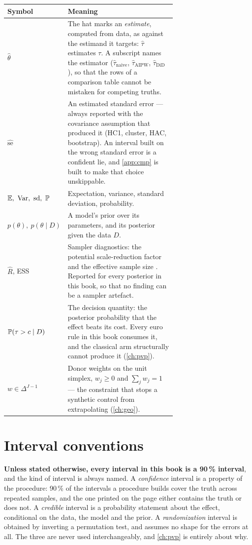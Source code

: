 \begin{center}
\small
\begin{longtable}{@{}l@{\hspace{1.5em}}p{0.68\linewidth}@{}}
\toprule
\textbf{Symbol} & \textbf{Meaning} \\
\midrule
\endhead
$\hat\theta$ & The hat marks an \emph{estimate}, computed from data, as against the estimand it
  targets: $\hat\tau$ estimates $\tau$. A subscript names the estimator
  ($\hat\tau_{\text{naive}}$, $\hat\tau_{\text{AIPW}}$, $\hat\tau_{\text{DiD}}$), so that the rows
  of a comparison table cannot be mistaken for competing truths. \\[2pt]
$\hat{\mathrm{se}}$ & An estimated standard error --- always reported with the covariance
  assumption that produced it (HC1, cluster, HAC, bootstrap). An interval built on the wrong
  standard error is a confident lie, and \cref{app:cmp} is built to make that choice
  unskippable. \\[2pt]
$\E,\ \Var,\ \sd,\ \Prob$ & Expectation, variance, standard deviation, probability. \\[2pt]
$p(\theta),\ p(\theta \mid D)$ & A model's prior over its parameters, and its posterior given the
  data $D$. \\[2pt]
$\hat R$, ESS & Sampler diagnostics: the potential scale-reduction factor and the effective sample
  size \citep{vehtari2021}. Reported for every posterior in this book, so that no finding can be a
  sampler artefact. \\[2pt]
$\operatorname{\mathbb{P}}(\tau > c \mid D)$ & The decision quantity: the posterior probability that the effect beats
  its cost. Every euro rule in this book consumes it, and the classical arm structurally cannot
  produce it (\cref{ch:pvp}). \\[2pt]
$w \in \Delta^{J-1}$ & Donor weights on the unit simplex, $w_j \ge 0$ and $\sum_j w_j = 1$ --- the
  constraint that stops a synthetic control from extrapolating (\cref{ch:geo}). \\
\bottomrule
\end{longtable}
\end{center}

\section*{Interval conventions}

\textbf{Unless stated otherwise, every interval in this book is a 90\,\% interval}, and the kind of
interval is always named. A \emph{confidence} interval is a property of the procedure: 90\,\% of
the intervals a procedure builds cover the truth across repeated samples, and the one printed on
the page either contains the truth or does not. A \emph{credible} interval is a probability
statement about the effect, conditional on the data, the model and the prior. A
\emph{randomization} interval is obtained by inverting a permutation test, and assumes no shape for
the errors at all. The three are never used interchangeably, and \cref{ch:pvp} is entirely about
why.

